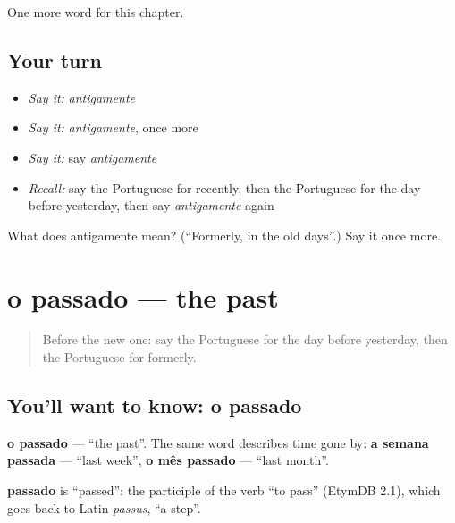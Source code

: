 \begin{grammarlens}[title={What you've built}]
One more word for this chapter.
\end{grammarlens}

\subsection*{Your turn}
\begin{itemize}
\raggedright
  \item \emph{Say it:} \emph{antigamente}
  \item \emph{Say it:} \emph{antigamente}, once more
  \item \emph{Say it:} say \emph{antigamente}
  \item \emph{Recall:} say the Portuguese for recently, then the Portuguese for the day before yesterday, then say \emph{antigamente} again
\end{itemize}

\begin{tcolorbox}[breakable,colback=teal!4,colframe=teal!35!black,title={Before you move on}]
What does antigamente mean? (\textquotedblleft{}Formerly, in the old days\textquotedblright{}.) Say it once more.
\end{tcolorbox}
\section[o passado]{o passado — the past}

\label{lesson:PT-C135-o-passado}



\begin{quote}
Before the new one: say the Portuguese for the day before yesterday, then the Portuguese for formerly.
\end{quote}

\subsection*{You'll want to know: o passado}
\textbf{o passado} — \textquotedblleft{}the past\textquotedblright{}. The same word describes time gone by: \textbf{a semana passada} — \textquotedblleft{}last week\textquotedblright{}, \textbf{o mês passado} — \textquotedblleft{}last month\textquotedblright{}.

\begin{cousinweb}
\textbf{passado} is \textquotedblleft{}passed\textquotedblright{}: the participle of the verb \textquotedblleft{}to pass\textquotedblright{} (EtymDB 2.1), which goes back to Latin \emph{passus}, \textquotedblleft{}a step\textquotedblright{}.
\end{cousinweb}

